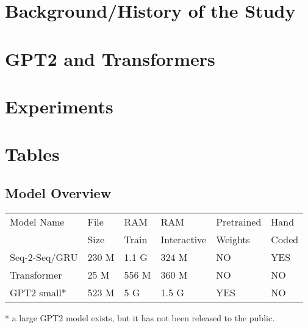 \documentclass[english]{report}
\begin{document}
\newpage

\tableofcontents

\newpage
\listoffigures
\listoftables
\newpage
{}

	


\chapter{Background/History of the Study}



\chapter{GPT2 and Transformers}



\chapter{Experiments}



\appendix





\newpage
	
\chapter{Tables}
	
\section{Model Overview}
	
\begin{center}

\begin{table}[h!]
	


\begin{tabular}{llllll}

	Model Name    & File  & RAM  & RAM  & Pretrained  & Hand  \\
	              &  Size & Train   & Interactive   & Weights & Coded   \\
	\hline
	\hline
	Seq-2-Seq/GRU & 230 M     & 1.1 G & 324 M & NO                 & YES        \\
	Transformer   & 25 M      & 556 M & 360 M & NO                 & NO         \\
	GPT2 small*   & 523 M     & 5 G   & 1.5 G & YES                & NO        \\
	\hline
\end{tabular}

* a large GPT2 model exists, but it has not been released to the public.

\label{fig:modeloverview}
\end{table}
\end{center}
\end{document}
